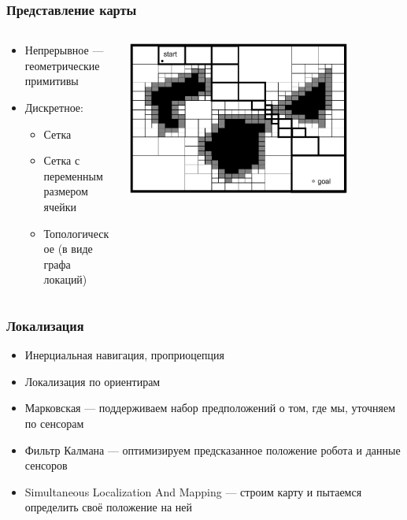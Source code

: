 \documentclass{../../slides-style}
\begin{document}
    \begin{frame}
        \frametitle{Представление карты}
        \begin{columns}
            \begin{column}{0.5\textwidth}
                \begin{itemize}
                    \item Непрерывное --- геометрические примитивы
                    \item Дискретное:
                    \begin{itemize}
                        \item Сетка
                        \item Сетка с переменным размером ячейки
                        \item Топологическое (в виде графа локаций)
                    \end{itemize}
                \end{itemize}
            \end{column}
            \begin{column}{0.5\textwidth}
                \begin{center}
                    \includegraphics[width=0.8\textwidth]{variableCellGrid.png}
                \end{center}
            \end{column}
        \end{columns}
    \end{frame}

    \begin{frame}
        \frametitle{Локализация}
        \begin{itemize}
            \item Инерциальная навигация, проприоцепция
            \item Локализация по ориентирам
            \item Марковская --- поддерживаем набор предположений о том, где мы, уточняем по сенсорам
            \item Фильтр Калмана --- оптимизируем предсказанное положение робота и данные сенсоров
            \item Simultaneous Localization And Mapping --- строим карту и пытаемся определить своё положение на ней
        \end{itemize}
    \end{frame}
\end{document}
